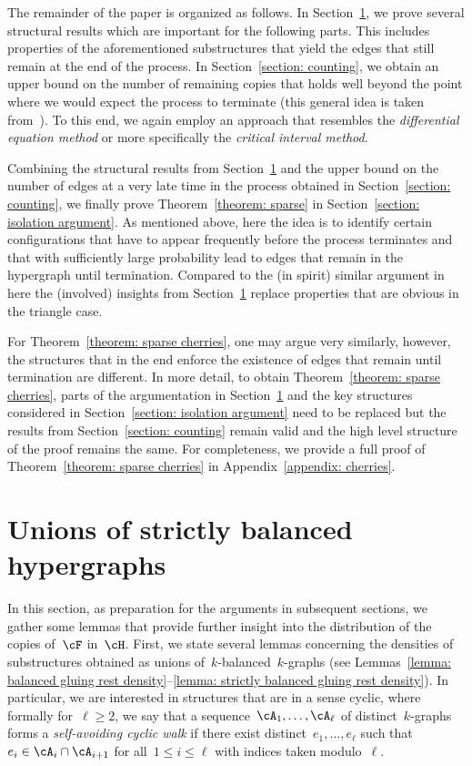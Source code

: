 \documentclass[11pt]{amsart}
\theoremstyle{definition}
\numberwithin{equation}{section}
\begin{document}
	
	The remainder of the paper is organized as follows.
	In Section~\ref{section: gluing}, we prove several structural results which are important for the following parts.
	This includes properties of the aforementioned substructures that yield the edges that still remain at the end of the process.
	In Section~\ref{section: counting}, we obtain an upper bound on the number of remaining copies that holds well beyond the point where we would expect the process to terminate (this general idea is taken from~\cite{BFL:15}). 
	To this end, we again employ an approach that resembles the \emph{differential equation method} or more specifically the \emph{critical interval method}.
	
	Combining the structural results from Section~\ref{section: gluing} and the upper bound on the number of edges at a very late time in the process obtained in Section~\ref{section: counting}, we finally prove Theorem~\ref{theorem: sparse} in Section~\ref{section: isolation argument}.
	As mentioned above, here the idea is to identify certain configurations that have to appear frequently before the process terminates and that with sufficiently large probability lead to edges that remain in the hypergraph until termination.
	Compared to the (in spirit) similar argument in~\cite[Section~6]{BFL:15} here the (involved) insights from Section~\ref{section: gluing} replace properties that are obvious in the triangle case.
	
	For Theorem~\ref{theorem: sparse cherries}, one may argue very similarly, however, the structures that in the end enforce the existence of edges that remain until termination are different.
	In more detail, to obtain Theorem~\ref{theorem: sparse cherries}, parts of the argumentation in Section~\ref{section: gluing} and the key structures considered in Section~\ref{section: isolation argument} need to be replaced but the results from Section~\ref{section: counting} remain valid and the high level structure of the proof remains the same.
	For completeness, we provide a full proof of Theorem~\ref{theorem: sparse cherries} in Appendix~\ref{appendix: cherries}.
	
	
	
	\section{Unions of strictly balanced hypergraphs}\label{section: gluing}
	
	In this section, as preparation for the arguments in subsequent sections, we gather some lemmas that provide further insight into the distribution of the copies of~$\cF$ in~$\cH$.
	First, we state several lemmas concerning the densities of substructures obtained as unions of~$k$-balanced~$k$-graphs (see Lemmas~\ref{lemma: balanced gluing rest density}--\ref{lemma: strictly balanced gluing rest density}).
	In particular, we are interested in structures that are in a sense cyclic, where formally for~$\ell\geq 2$, we say that a sequence~$\cA_1,\ldots,\cA_\ell$ of distinct~$k$-graphs forms a \emph{self-avoiding cyclic walk} if there exist distinct~$e_1,\ldots,e_\ell$ such that~$e_i\in\cA_i\cap \cA_{i+1}$ for all~$1\leq i\leq\ell$ with indices taken modulo~$\ell$.
	
\end{document}
